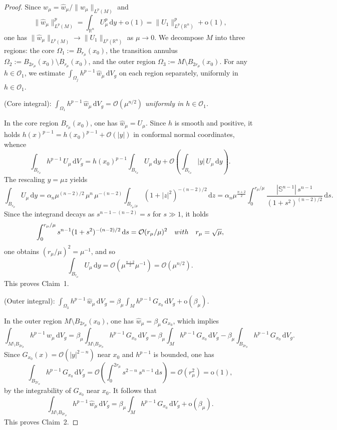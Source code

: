 \documentclass[10pt,a4paper]{amsart}
\newcommand{\R}{\mathbb{R}}
\newcommand{\Ss}{\mathbb{S}}
\newcommand{\ud}{\,\mathrm{d}}
\begin{document}
\begin{proof}
Since $w_\mu = \hat{w}_\mu / \|\hat{w}_\mu\|_{L^p(M)}$ and
\[
\|\hat{w}_\mu\|_{L^p(M)}^p = \int_{\R^n} U_\mu^p \ud y + \mathrm{o}(1) = \|U_1\|_{L^p(\R^n)}^p + \mathrm{o}(1),\]
one has $\|\hat{w}_\mu\|_{L^p(M)} \to \|U_1\|_{L^p(\R^n)}$ as $\mu \to 0$. We decompose $M$ into three regions: the core $\Omega_1 := B_{r_\mu}(x_0)$, the transition annulus $\Omega_2 := B_{2r_\mu}(x_0) \setminus B_{r_\mu}(x_0)$, and the outer region $\Omega_3 := M \setminus B_{2r_\mu}(x_0)$. For any $h \in \mathscr{O}_1$, we estimate $\int_{\Omega_j} h^{p-1}\, \hat{w}_\mu \ud V_g$ on each region separately, uniformly in $h \in \mathscr O_1$.

\medskip
{} {\rm (Core integral):} {\it $\int_{\Omega_1} h^{p-1}\, \hat{w}_\mu \ud V_g = \mathcal{O}(\mu^{n/2})$ uniformly in $h \in \mathscr{O}_1$.}

\smallskip
{} In the core region $B_{r_\mu}(x_0)$, one has $\hat{w}_\mu = U_\mu$. Since $h$ is smooth and positive, it holds $h(x)^{p-1} = h(x_0)^{p-1} + \mathcal{O}(|y|)$ in conformal normal coordinates, whence
\[
\int_{B_{r_\mu}} h^{p-1}\, U_\mu \ud V_g = h(x_0)^{p-1} \int_{B_{r_\mu}} U_\mu \ud y + \mathcal{O}\!\left(\int_{B_{r_\mu}} |y|\, U_\mu \ud y\right).
\]
The rescaling $y = \mu z$ yields
\[
\int_{B_{r_\mu}} U_\mu \ud y = \alpha_n \mu^{(n-2)/2}\, \mu^n\, \mu^{-(n-2)} \int_{B_{r_\mu/\mu}} (1 + |z|^2)^{-(n-2)/2} \ud z = \alpha_n \mu^\frac{n+2}{2}\int_0^{r_\mu/\mu} \frac{|\Ss^{n-1}|\, s^{n-1}}{(1 + s^2)^{(n-2)/2}} \ud s.
\]
Since the integrand decays as $s^{n-1-(n-2)} = s$ for $s \gg 1$, it holds
\[
\int_0^{r_\mu/\mu} s^{n-1}(1+s^2)^{-(n-2)/2} \ud s=\mathcal{O}(r_\mu/\mu)^2 \quad {\rm with} \quad r_\mu = \sqrt{\mu},
\]
one obtains $(r_\mu/\mu)^2 = \mu^{-1}$, and so
\[
\int_{B_{r_\mu}} U_\mu \ud y = \mathcal{O}(\mu^\frac{n+2}{2} \mu^{-1}) = \mathcal{O}(\mu^{n/2}).
\]
This proves Claim~1.

\medskip
{} {\rm (Outer integral):} {\it $\int_{\Omega_3} h^{p-1}\, \hat{w}_\mu \ud V_g = \beta_\mu \int_M h^{p-1}\, G_{x_0} \ud V_g + \mathrm{o}(\beta_\mu)$.}

\smallskip
{} In the outer region $M \setminus B_{2r_\mu}(x_0)$, one has $\hat{w}_\mu = \beta_\mu\, G_{x_0}$, which implies
\[
\int_{M \setminus B_{2r_\mu}} h^{p-1}\, \hat{w}_\mu \ud V_g = \beta_\mu \int_{M \setminus B_{2r_\mu}} h^{p-1}\, G_{x_0} \ud V_g = \beta_\mu \int_M h^{p-1}\, G_{x_0} \ud V_g - \beta_\mu \int_{B_{2r_\mu}} h^{p-1}\, G_{x_0} \ud V_g.
\]
Since $G_{x_0}(x) = \mathcal{O}(|y|^{2-n})$ near $x_0$ and $h^{p-1}$ is bounded, one has
\[
\int_{B_{2r_\mu}} h^{p-1}\, G_{x_0} \ud V_g = \mathcal{O}\!\left(\int_0^{2r_\mu} s^{2-n}\, s^{n-1} \ud s\right) = \mathcal{O}(r_\mu^2) = \mathrm{o}(1),
\]
by the integrability of $G_{x_0}$ near $x_0$. It follows that
\[
\int_{M \setminus B_{2r_\mu}} h^{p-1}\, \hat{w}_\mu \ud V_g = \beta_\mu \int_M h^{p-1}\, G_{x_0} \ud V_g + \mathrm{o}(\beta_\mu).
\]
This proves Claim~2.


\end{proof}
\end{document}
